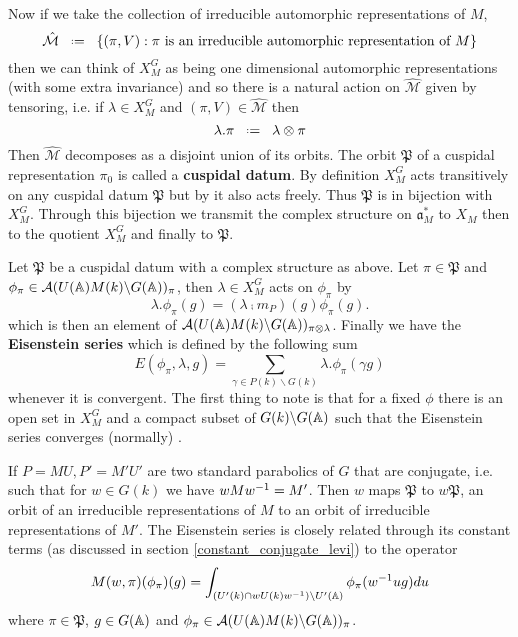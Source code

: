 Now if we take the collection of irreducible automorphic representations of \(M\),
 \[\hat{\mathcal{M}} \defeq \{(\pi, V) : \pi \text{ is an irreducible automorphic representation of }M\}\]
then we can think of \(X_M^G\) as being one dimensional automorphic representations (with some extra invariance) and so there is a natural action on \(\hat{\mathcal{M}}\) given by tensoring, i.e. if \(\lambda\in X_M^G\) and \((\pi, V)\in \hat{\mathcal{M}}\) then 
\[\lambda.\pi \defeq \lambda\tensor \pi\]
Then \(\hat{\mathcal{M}}\) decomposes as a disjoint union of its orbits. The orbit \(\mathfrak{P}\) of a cuspidal representation \(\pi_0\) is called a \textbf{cuspidal datum}. By definition \(X_M^G\) acts transitively on any cuspidal datum \(\mathfrak{P}\) but by \cite[II.1]{moeglinSpectralDecompositionEisenstein1995} it also acts freely. Thus \(\mathfrak{P}\) is in bijection with \(X_M^G\). Through this bijection we transmit the complex structure on \(\mathfrak{a}_M^*\) to \(X_M\) then to the quotient \(X_M^G\) and finally to \(\mathfrak{P}\).

Let \(\mathfrak{P}\) be a cuspidal datum with a complex structure as above. Let \(\pi\in \mathfrak{P}\) and \(\phi_\pi \in \mathcal{A}(U(\A)M(k)\backslash G(\A))_\pi\), then \(\lambda\in X_M^G\) acts on \(\phi_\pi\) by 
\[\lambda.\phi_\pi(g) = (\lambda \comp m_P)(g) \phi_\pi(g).\]
which is then an element of \(\mathcal{A}(U(\A)M(k)\backslash G(\A))_{\pi\tensor \lambda}\). Finally we have the \textbf{Eisenstein series} which is defined by the following sum
\[E(\phi_\pi, \lambda, g) = \sum_{\gamma \in P(k)\backslash G(k)} \lambda.\phi_\pi(\gamma g)\]
whenever it is convergent. The first thing to note is that for a fixed \(\phi\) there is an open set in \(X_M^G\) and a compact subset of \(G(k)\backslash G(\A)\) such that the Eisenstein series converges (normally) \cite[II.1.5]{moeglinSpectralDecompositionEisenstein1995}.

If \(P = MU, P' = M'U'\) are two standard parabolics of \(G\) that are conjugate, i.e. such that for \(w\in G(k)\) we have \(wMw^{-1} = M'\).
Then \(w\) maps \(\mathfrak{P}\) to \(w\mathfrak{P}\), an orbit of an irreducible representations of \(M\) to an orbit of irreducible representations of \(M'\).
The Eisenstein series is closely related through its constant terms (as discussed in section \ref{constant_conjugate_levi}) to the operator
\[M(w, \pi)(\phi_\pi)(g) = \int_{(U'(k)\cap wU(k)w\inv )\backslash U'(\A)} \phi_\pi(w\inv ug) du\]
where \(\pi\in \mathfrak{P}\), \(g\in G(\A)\) and \(\phi_\pi \in \mathcal{A}(U(\A)M(k)\backslash G(\A))_\pi\).

